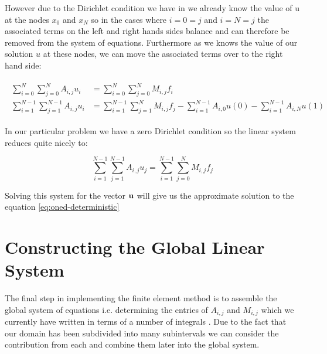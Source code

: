 However due to the Dirichlet condition we have in  we already know the value
of u at the nodes $x_0$ and $x_N$ so in the cases where $i = 0 = j$ and $i = N = j$ the associated terms on the left
and right hands sides balance and can therefore be removed from the system of equations. Furthermore as we knows the
value of our solution $u$ at these nodes, we can move the associated terms over to the right hand side:

\begin{align}
  \begin{split}
	\sum_{i=0}^N\sum_{j=0}^NA_{i,j}u_i &= \sum_{i=0}^N\sum_{j=0}^NM_{i,j}f_i \\
    \sum_{i=1}^{N-1}\sum_{j=1}^{N-1}A_{i,j}u_i &= \sum_{i=1}^{N-1}\sum_{j=1}^{N}M_{i,j}f_j
                                                - \sum_{i=1}^{N-1}A_{i,0}u(0)
                                                - \sum_{i=1}^{N-1}A_{i,N}u(1)
  \end{split}
\end{align}

In our particular problem we have a zero Dirichlet condition so the linear system reduces quite nicely to:

\begin{equation}\label{eq:oned-deterministic-fem}
	\sum_{i=1}^{N-1}\sum_{j=1}^{N-1}A_{i,j}u_j = \sum_{i=1}^{N-1}\sum_{j=0}^NM_{i,j}f_j
\end{equation}

Solving this system for the vector $\mathbf{u}$ will give us the approximate solution to the equation
\ref{eq:oned-deterministic}

\section{Constructing the Global Linear System}

The final step in implementing the finite element method is to assemble the global system of equations i.e.
determining the entries of $A_{i,j}$ and $M_{i,j}$ which we currently have written in terms of a number of
integrals . Due to the fact that our domain has been subdivided into 
many subintervals we can consider the contribution from each and combine them later into the global system.

